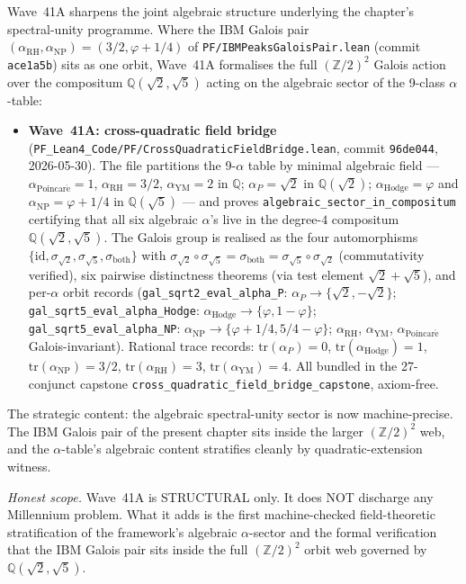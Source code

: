 \begin{remark}\label{rem:spectral-unity-wave41-lean}
Wave~41A sharpens the joint algebraic structure underlying the chapter's spectral-unity programme. Where the IBM Galois pair $(\alpha_{\mathrm{RH}}, \alpha_{\mathrm{NP}}) = (3/2, \varphi + 1/4)$ of \texttt{PF/IBMPeaksGaloisPair.lean} (commit \texttt{ace1a5b}) sits as one orbit, Wave~41A formalises the full $(\mathbb{Z}/2)^2$ Galois action over the compositum $\mathbb{Q}(\sqrt{2}, \sqrt{5})$ acting on the algebraic sector of the 9-class $\alpha$-table:
\begin{itemize}
  \item \textbf{Wave~41A: cross-quadratic field bridge} (\texttt{PF\_Lean4\_Code/PF/CrossQuadraticFieldBridge.lean}, commit \texttt{96de044}, 2026-05-30). The file partitions the 9-$\alpha$ table by minimal algebraic field --- $\alpha_{\mathrm{Poincar\acute e}} = 1$, $\alpha_{\mathrm{RH}} = 3/2$, $\alpha_{\mathrm{YM}} = 2$ in $\mathbb{Q}$; $\alpha_P = \sqrt{2}$ in $\mathbb{Q}(\sqrt{2})$; $\alpha_{\mathrm{Hodge}} = \varphi$ and $\alpha_{\mathrm{NP}} = \varphi + 1/4$ in $\mathbb{Q}(\sqrt{5})$ --- and proves \texttt{algebraic\_sector\_in\_compositum} certifying that all six algebraic $\alpha$'s live in the degree-$4$ compositum $\mathbb{Q}(\sqrt{2}, \sqrt{5})$. The Galois group is realised as the four automorphisms $\{\mathrm{id}, \sigma_{\sqrt{2}}, \sigma_{\sqrt{5}}, \sigma_{\mathrm{both}}\}$ with $\sigma_{\sqrt{2}} \circ \sigma_{\sqrt{5}} = \sigma_{\mathrm{both}} = \sigma_{\sqrt{5}} \circ \sigma_{\sqrt{2}}$ (commutativity verified), six pairwise distinctness theorems (via test element $\sqrt{2} + \sqrt{5}$), and per-$\alpha$ orbit records (\texttt{gal\_sqrt2\_eval\_alpha\_P}: $\alpha_P \to \{\sqrt{2}, -\sqrt{2}\}$; \texttt{gal\_sqrt5\_eval\_alpha\_Hodge}: $\alpha_{\mathrm{Hodge}} \to \{\varphi, 1 - \varphi\}$; \texttt{gal\_sqrt5\_eval\_alpha\_NP}: $\alpha_{\mathrm{NP}} \to \{\varphi + 1/4, 5/4 - \varphi\}$; $\alpha_{\mathrm{RH}}$, $\alpha_{\mathrm{YM}}$, $\alpha_{\mathrm{Poincar\acute e}}$ Galois-invariant). Rational trace records: $\mathrm{tr}(\alpha_P) = 0$, $\mathrm{tr}(\alpha_{\mathrm{Hodge}}) = 1$, $\mathrm{tr}(\alpha_{\mathrm{NP}}) = 3/2$, $\mathrm{tr}(\alpha_{\mathrm{RH}}) = 3$, $\mathrm{tr}(\alpha_{\mathrm{YM}}) = 4$. All bundled in the 27-conjunct capstone \texttt{cross\_quadratic\_field\_bridge\_capstone}, axiom-free.
\end{itemize}
The strategic content: the algebraic spectral-unity sector is now machine-precise. The IBM Galois pair of the present chapter sits inside the larger $(\mathbb{Z}/2)^2$ web, and the $\alpha$-table's algebraic content stratifies cleanly by quadratic-extension witness.

\emph{Honest scope.} Wave~41A is STRUCTURAL only. It does NOT discharge any Millennium problem. What it adds is the first machine-checked field-theoretic stratification of the framework's algebraic $\alpha$-sector and the formal verification that the IBM Galois pair sits inside the full $(\mathbb{Z}/2)^2$ orbit web governed by $\mathbb{Q}(\sqrt{2}, \sqrt{5})$.
\end{remark}

